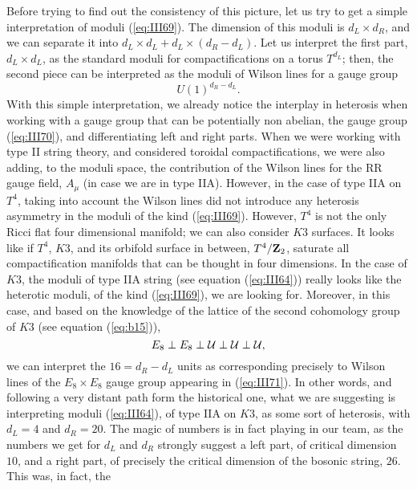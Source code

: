 Before trying to find out the consistency of this picture, let us
try to get a simple interpretation of moduli (\ref{eq:III69}).
The dimension of this moduli is $d_L \times d_R$, and we can
separate it into $d_L \times d_L + d_L \times (d_R -d_L)$. Let us
interpret the first part, $d_L \times d_L$, as the standard
moduli for compactifications on a torus $T^{d_L}$; then, the
second piece can be interpreted as the moduli of Wilson lines for
a gauge group
\begin{equation}
U(1)^{d_R-d_L}.
\label{eq:III70}
\end{equation}
With this simple interpretation, we already notice the interplay
in heterosis when working with a gauge group that can be
potentially non abelian, the gauge group (\ref{eq:III70}), and
differentiating left and right parts. When we were working with
type II string theory, and considered toroidal compactifications,
we were also adding, to the moduli space, the contribution of the
Wilson lines for the RR gauge field, $A_{\mu}$ (in case we are in
type IIA). However, in the case of type IIA on $T^4$, taking 
into account the Wilson lines did not introduce any 
heterosis asymmetry in the moduli of the kind (\ref{eq:III69}).
However, $T^4$ is not the only Ricci flat four dimensional
manifold; we can also consider $K3$ surfaces. It looks like if
$T^4$, $K3$, and its orbifold surface in between, $T^4/{\bf
Z}_2$, saturate all compactification manifolds that can be
thought in four dimensions. In the case of $K3$, the moduli of
type IIA string (see equation (\ref{eq:III64})) really looks like
the heterotic moduli, of the kind (\ref{eq:III69}), we are looking
for. Moreover, in this case, and based on the knowledge of the
lattice of the second cohomology group of $K3$ (see equation
(\ref{eq:b15})),
\begin{equation}
E_8 \perp E_8 \perp {\cal U} \perp {\cal U} \perp {\cal U},
\label{eq:III71}
\end{equation}
we can interpret the $16=d_R-d_L$ units as corresponding
precisely to Wilson lines of the $E_8 \times E_8$ gauge group
appearing in (\ref{eq:III71}). In other words, and following a
very distant path form the historical one, what we are suggesting
is interpreting moduli (\ref{eq:III64}), of type IIA on $K3$, as
some sort of heterosis, with $d_L=4$ and $d_R=20$. The magic of
numbers is in fact playing in our team, as the numbers we get for
$d_L$ and $d_R$ strongly suggest a left part, of critical
dimension $10$, and a right part, of precisely the critical
dimension of the bosonic string, $26$. This was, in fact, the
